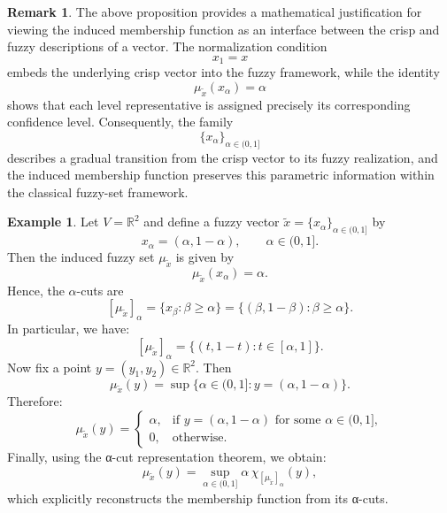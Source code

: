 \documentclass[preprint,12pt]{elsarticle}
\theoremstyle{definition}
\newtheorem{remark}{Remark}[section]
\newtheorem{example}[theorem]{Example}
\begin{document}
 
 \begin{remark} The above proposition provides a mathematical justification for viewing the induced membership function as an interface between the crisp and fuzzy descriptions of a vector. The normalization condition \[ x_1=x \] embeds the underlying crisp vector into the fuzzy framework, while the identity \[ \mu_{\tilde{x}}(x_\alpha)=\alpha \] shows that each level representative is assigned precisely its corresponding confidence level. Consequently, the family \[ \{x_\alpha\}_{\alpha\in(0,1]} \] describes a gradual transition from the crisp vector to its fuzzy realization, and the induced membership function preserves this parametric information within the classical fuzzy-set framework. \end{remark}
 
 \begin{example}
	Let $V=\mathbb{R}^2$ and define a fuzzy vector $\tilde{x}=\{x_\alpha\}_{\alpha\in(0,1]}$ by
	\[
	x_\alpha = (\alpha, 1-\alpha), \qquad \alpha\in(0,1].
	\]
	Then the induced fuzzy set $\mu_{\tilde{x}}$ is given by
	\[
	\mu_{\tilde{x}}(x_\alpha)=\alpha.
	\]
	Hence, the $\alpha$-cuts are
	\[
	[\mu_{\tilde{x}}]_\alpha
	=
	\{x_\beta:\beta\ge \alpha\}
	=
	\{(\beta,1-\beta): \beta\ge \alpha\}.
	\]
		In particular, we have:
	\[
	[\mu_{\tilde{x}}]_\alpha
	=
	\{(t,1-t): t\in[\alpha,1]\}.
	\]
	Now fix a point $y=(y_1,y_2)\in \mathbb{R}^2$. Then
	\[
	\mu_{\tilde{x}}(y)
	=
	\sup\{\alpha\in(0,1]: y=(\alpha,1-\alpha)\}.
	\]
	Therefore:
	\[
	\mu_{\tilde{x}}(y)=
	\begin{cases}
		\alpha, & \text{if } y=(\alpha,1-\alpha)\text{ for some }\alpha\in(0,1],\\[2mm]
		0, & \text{otherwise}.
	\end{cases}
	\]
	Finally, using the α-cut representation theorem, we obtain:
	\[
	\mu_{\tilde{x}}(y)
	=
	\sup_{\alpha\in(0,1]} \alpha\,\chi_{[\mu_{\tilde{x}}]_\alpha}(y),
	\]
	which explicitly reconstructs the membership function from its α-cuts.
\end{example}
\end{document}
